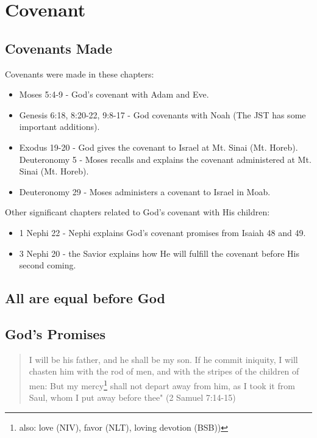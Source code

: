 \chapter{Covenant}


\section{Covenants Made}

Covenants were made in these chapters:
\begin{itemize}
  \item Moses 5:4-9 - God's covenant with Adam and Eve.
  \item Genesis 6:18, 8:20-22, 9:8-17 - God covenants with Noah (The JST has some important additions).
  \item Exodus 19-20 - God gives the covenant to Israel at Mt. Sinai (Mt. Horeb).
  \subitem Deuteronomy 5 - Moses recalls and explains the covenant administered at Mt. Sinai (Mt. Horeb).
  \item Deuteronomy 29 - Moses administers a covenant to Israel in Moab.
\end{itemize}

Other significant chapters related to God's covenant with His children:
\begin{itemize}
  \item 1 Nephi 22 - Nephi explains God's covenant promises from Isaiah 48 and 49.
  \item 3 Nephi 20 - the Savior explains how He will fulfill the covenant before His second coming.
\end{itemize}

\section{All are equal before God}

\section{God's Promises}

\begin{quotation}
I will be his father, and he shall be my son. If he commit iniquity, I will chasten him with the rod of men, and with the stripes of the children of men: But my mercy\footnote{also: love (NIV), favor (NLT), loving devotion (BSB))} shall not depart away from him, as I took it from Saul, whom I put away before thee" (2 Samuel 7:14-15)
\end{quotation}

